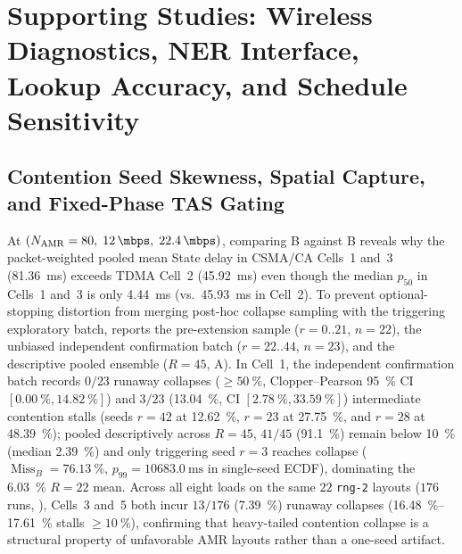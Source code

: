 \documentclass[11pt,a4paper]{article}
\newcommand{\Namr}{\ensuremath{N_{\mathrm{AMR}}}}
\newcommand{\MissB}{\ensuremath{\operatorname{Miss}_B}}
\begin{document}
\section{Supporting Studies: Wireless Diagnostics, NER Interface, Lookup Accuracy, and Schedule Sensitivity}
\label{sec:supporting}

\subsection{Contention Seed Skewness, Spatial Capture, and Fixed-Phase TAS Gating}
\label{sec:micro_diagnostics}

At $(\Namr=80,\; \qty{12}{\mbps},\; \qty{22.4}{\mbps})$, comparing B against B reveals why the packet-weighted pooled mean State delay in CSMA/CA Cells~1 and~3 (\qty{81.36}{\milli\second}) exceeds TDMA Cell~2 (\qty{45.92}{\milli\second}) even though the median $p_{50}$ in Cells~1 and~3 is only \qty{4.44}{\milli\second} (vs.\ \qty{45.93}{\milli\second} in Cell~2). To prevent optional-stopping distortion from merging post-hoc collapse sampling with the triggering exploratory batch,  reports the pre-extension sample ($r = 0..21$, $n=22$), the unbiased independent confirmation batch ($r = 22..44$, $n=23$), and the descriptive pooled ensemble ($R=45$, A). In Cell~1, the independent confirmation batch records $0/23$ runaway collapses ($\ge \qty{50}{\percent}$, Clopper--Pearson \qty{95}{\percent} CI $[\qty{0.00}{\percent}, \qty{14.82}{\percent}]$) and $3/23$ (\qty{13.04}{\percent}, CI $[\qty{2.78}{\percent}, \qty{33.59}{\percent}]$) intermediate contention stalls (seeds $r=42$ at \qty{12.62}{\percent}, $r=23$ at \qty{27.75}{\percent}, and $r=28$ at \qty{48.39}{\percent}); pooled descriptively across $R=45$, $41/45$ (\qty{91.1}{\percent}) remain below \qty{10}{\percent} (median \qty{2.39}{\percent}) and only triggering seed $r=3$ reaches collapse ($\MissB = \qty{76.13}{\percent}$, $p_{99} = \qty{10683.0}{\milli\second}$ in single-seed ECDF), dominating the \qty{6.03}{\percent} $R=22$ mean. Across all eight loads on the same $22$ \texttt{rng-2} layouts ($176$ runs, ), Cells~3 and~5 both incur $13/176$ (\qty{7.39}{\percent}) runaway collapses (\qtyrange{16.48}{17.61}{\percent} stalls $\ge \qty{10}{\percent}$), confirming that heavy-tailed contention collapse is a structural property of unfavorable AMR layouts rather than a one-seed artifact.
\end{document}
